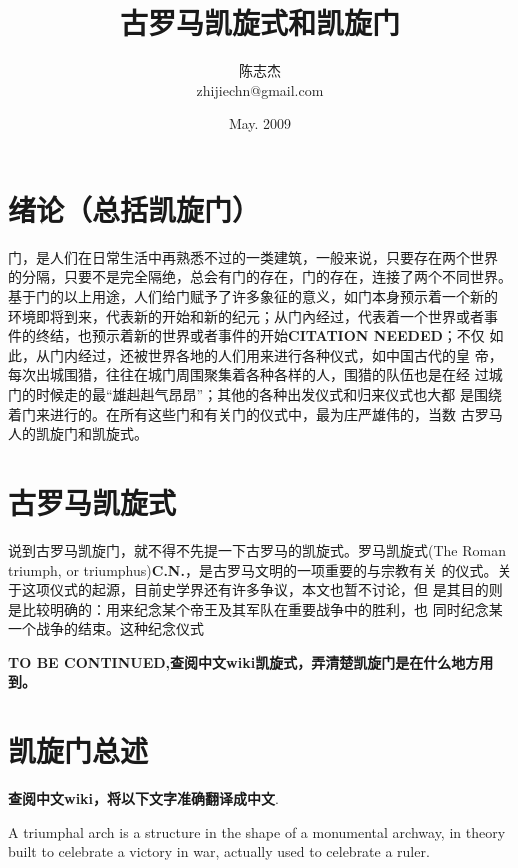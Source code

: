 \documentclass[a4paper,dvipdfm]{article}
\begin{document}


\title{古罗马凯旋式和凯旋门}
\author{陈志杰 \\ zhijiechn@gmail.com}
\date{May. 2009}

\maketitle

\tableofcontents

\section{绪论（总括凯旋门）}

门，是人们在日常生活中再熟悉不过的一类建筑，一般来说，只要存在两个世界
的分隔，只要不是完全隔绝，总会有门的存在，门的存在，连接了两个不同世界。
基于门的以上用途，人们给门赋予了许多象征的意义，如门本身预示着一个新的
环境即将到来，代表新的开始和新的纪元；从门內经过，代表着一个世界或者事
件的终结，也预示着新的世界或者事件的开始\textbf{CITATION NEEDED}；不仅
如此，从门内经过，还被世界各地的人们用来进行各种仪式，如中国古代的皇
帝，每次出城围猎，往往在城门周围聚集着各种各样的人，围猎的队伍也是在经
过城门的时候走的最``雄赳赳气昂昂''；其他的各种出发仪式和归来仪式也大都
是围绕着门来进行的。在所有这些门和有关门的仪式中，最为庄严雄伟的，当数
古罗马人的凯旋门和凯旋式。

\section{古罗马凯旋式}

说到古罗马凯旋门，就不得不先提一下古罗马的凯旋式。罗马凯旋式(The Roman
triumph, or triumphus)\textbf{C.N.}，是古罗马文明的一项重要的与宗教有关
的仪式。关于这项仪式的起源，目前史学界还有许多争议，本文也暂不讨论，但
是其目的则是比较明确的：用来纪念某个帝王及其军队在重要战争中的胜利，也
同时纪念某一个战争的结束。这种纪念仪式

\textbf{TO BE CONTINUED,查阅中文wiki凯旋式，弄清楚凯旋门是在什么地方用
  到。}

\section{凯旋门总述}

\textbf{查阅中文wiki，将以下文字准确翻译成中文}.

A triumphal arch is a structure in the shape of a monumental archway,
in theory built to celebrate a victory in war, actually used to
celebrate a ruler.
\end{document}

